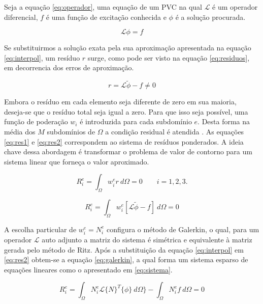 \documentclass[
    12pt,               %
    openright,          %
    oneside,
    a4paper,            %
    english,            %
    french,             %
    spanish,            %
    brazil              %
    ]{abntex2}
\begin{document}
Seja a equação \ref{eq:operador}, uma equação de um PVC na qual $\mathcal{L}$ é um operador diferencial, $f$ é uma função de excitação conhecida e $\phi$ é a solução procurada.

\begin{equation}
\label{eq:operador}
\mathcal{L} \phi = f
\end{equation}

Se substituirmos a solução exata pela sua aproximação apresentada na equação \ref{eq:interpol}, um resíduo $r$ surge, como pode ser visto na equação \ref{eq:residuos}, em decorrencia dos erros de aproximação.

\begin{equation}
\label{eq:residuos}
r = \mathcal{L} \tilde{\phi} - f \neq 0
\end{equation}

Embora o resíduo em cada elemento seja diferente de zero em sua maioria, deseja-se que o resíduo total seja igual a zero. Para que isso seja possível, uma função de poderação $w_i$ é introduzida para cada subdomínio $e$. Desta forma na média dos $M$ subdomínios de $\Omega$ a condição residual é atendida \cite{volakis}.
As equações \ref{eq:res1} e \ref{eq:res2} correspondem ao sistema de resíduos ponderados. A ideia chave dessa abordagem é transformar o problema de valor de contorno para um sistema linear que forneça o valor aproximado. 

\begin{equation}
\label{eq:res1}
R_i^e = \int_{\Omega}{w_i^e r \ d\Omega} = 0 \qquad i = 1,2,3.
\end{equation}

\begin{equation}
\label{eq:res2}
R_i^e = \int_{\Omega}{w_i^e [\mathcal{L} \tilde{\phi} - f] \ d\Omega} = 0
\end{equation}  


A escolha particular de $w_i^e = N^e_i$ configura o método de Galerkin, o qual, para um operador $\mathcal{L}$ auto adjunto a matriz do sistema é simétrica e equivalente à matriz gerada pelo método de Ritz. Após a substituição da equação \ref{eq:interpol} em \ref{eq:res2} obtem-se a equação \ref{eq:galerkin}, a qual forma um sistema esparso de equações lineares como o apresentado em \ref{eq:sistema}.


\begin{equation}
\label{eq:galerkin}
R_i^e = \int_{\Omega}{N_i^e \mathcal{L} \{N\}^T \{\phi\} \ d\Omega\}} - \int_{\Omega}{N^e_i f \ d \Omega} = 0
\end{equation} 
\end{document}
